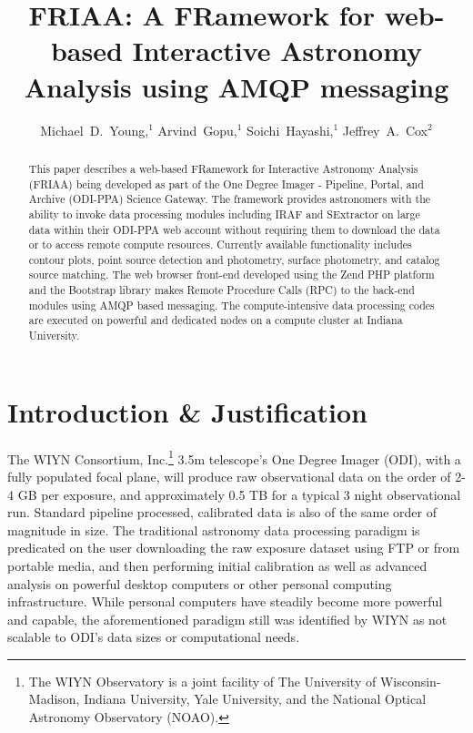 
\resetcounters


\title{FRIAA: A FRamework for web-based Interactive Astronomy Analysis using AMQP messaging}
\author{Michael~D.~Young,$^1$ Arvind~Gopu,$^1$ Soichi~Hayashi,$^1$ Jeffrey~A.~Cox$^2$
}


\begin{abstract}
This paper describes a web-based FRamework for Interactive Astronomy Analysis (FRIAA) being developed as part of the One Degree Imager - Pipeline, Portal, and Archive (ODI-PPA) Science Gateway. The framework provides astronomers with the ability to invoke data processing modules including IRAF and SExtractor on large data within their ODI-PPA web account without requiring them to download the data or to access remote compute resources. Currently available functionality includes contour plots, point source detection and photometry, surface photometry, and catalog source matching. The web browser front-end developed using the Zend PHP platform and the Bootstrap library makes Remote Procedure Calls (RPC) to the back-end modules using AMQP based messaging. The compute-intensive data processing codes are executed on powerful and dedicated nodes on a compute cluster at Indiana University. 

\end{abstract}

\section{Introduction \& Justification}
\label{section:intro}

The WIYN Consortium, Inc.\footnote{The WIYN Observatory is a joint facility of The University of Wisconsin-Madison, Indiana University, Yale University, and the National Optical Astronomy Observatory (NOAO).} 3.5m telescope's One Degree Imager (ODI), with a fully populated focal plane, will produce raw observational data on the order of 2-4 GB per exposure, and approximately 0.5 TB for a typical 3 night observational run. Standard pipeline processed, calibrated data is also of the same order of magnitude in size. The traditional astronomy data processing paradigm is predicated on the user downloading the raw exposure dataset using FTP or from portable media, and then performing initial calibration as well as advanced analysis on powerful desktop computers or other personal computing infrastructure. While personal computers have steadily become more powerful and capable, the aforementioned paradigm still was identified by WIYN as not scalable to ODI's data sizes or computational needs. 

